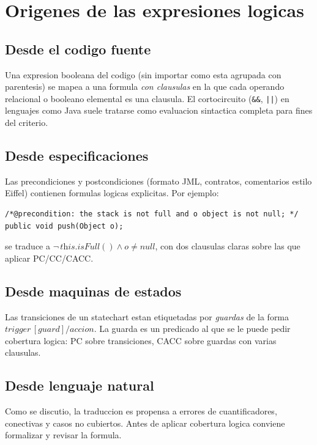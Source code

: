 \documentclass[12pt,a4paper]{article}
\begin{document}
\section{Origenes de las expresiones logicas}

\subsection{Desde el codigo fuente}

Una expresion booleana del codigo (sin importar como esta agrupada con parentesis) se mapea a
una formula \emph{con clausulas} en la que cada operando relacional o booleano elemental es una
clausula. El cortocircuito (\texttt{\&\&}, \texttt{||}) en lenguajes como Java suele tratarse
como evaluacion sintactica completa para fines del criterio.

\subsection{Desde especificaciones}

Las precondiciones y postcondiciones (formato JML, contratos, comentarios estilo Eiffel)
contienen formulas logicas explicitas. Por ejemplo:

\begin{lstlisting}[style=codestyle]
/*@precondition: the stack is not full and o object is not null; */
public void push(Object o);
\end{lstlisting}
se traduce a $\neg\,\textit{this.isFull}() \wedge o \ne \textit{null}$, con dos clausulas claras
sobre las que aplicar PC/CC/CACC.

\subsection{Desde maquinas de estados}

Las transiciones de un statechart estan etiquetadas por \emph{guardas} de la forma
$\textit{trigger}\,[\textit{guard}] / \textit{accion}$. La guarda es un predicado al que se le
puede pedir cobertura logica: PC sobre transiciones, CACC sobre guardas con varias clausulas.

\subsection{Desde lenguaje natural}

Como se discutio, la traduccion es propensa a errores de cuantificadores, conectivas y casos no
cubiertos. Antes de aplicar cobertura logica conviene formalizar y revisar la formula.
\end{document}
